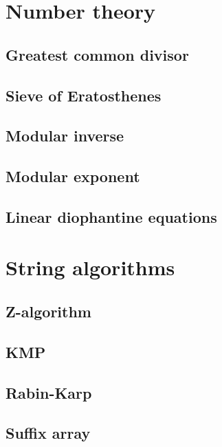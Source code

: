 \documentclass[a4paper,10pt]{article}
\begin{document}
\pagestyle{fancy}
\chead{}
\rhead{\thepage}
\lfoot{}
\cfoot{}
\rfoot{}

\twocolumn

\tableofcontents
\newpage
\section{Number theory}
\subsection{Greatest common divisor}

\subsection{Sieve of Eratosthenes}

\subsection{Modular inverse}

\subsection{Modular exponent}

\subsection{Linear diophantine equations}

\newpage
\section{String algorithms}
\subsection{Z-algorithm}

\subsection{KMP}

\subsection{Rabin-Karp}

\subsection{Suffix array}

\newpage
\end{document}
